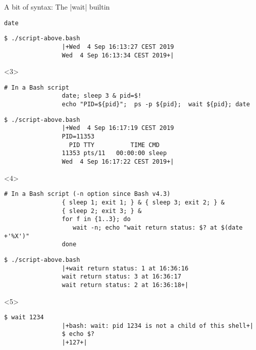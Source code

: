 \begin{frame}[fragile]{A bit of syntax: The \bash|wait| builtin}
\begin{overlayarea}{\textwidth}{0.7\textheight}
\begin{onlyenv}
\begin{lstlisting}[style=MyBash, numbers=none, aboveskip=3mm]
                date
            \end{lstlisting}
            \begin{lstlisting}[style=MyBash, numbers=none, aboveskip=1mm]
                $ ./script-above.bash
                |+Wed  4 Sep 16:13:27 CEST 2019
                Wed  4 Sep 16:13:34 CEST 2019+|
            \end{lstlisting}
        \end{onlyenv}
        \begin{onlyenv}<3>
            \begin{lstlisting}[style=MyBash, numbers=none, aboveskip=3mm]
                # In a Bash script
                date; sleep 3 & pid=$!
                echo "PID=${pid}";  ps -p ${pid};  wait ${pid}; date
            \end{lstlisting}
            \begin{lstlisting}[style=MyBash, numbers=none, aboveskip=1mm]
                $ ./script-above.bash
                |+Wed  4 Sep 16:17:19 CEST 2019
                PID=11353
                  PID TTY          TIME CMD
                11353 pts/11   00:00:00 sleep
                Wed  4 Sep 16:17:22 CEST 2019+|
            \end{lstlisting}
        \end{onlyenv}
        \begin{onlyenv}<4>
            \begin{lstlisting}[style=MyBash, numbers=none, aboveskip=3mm]
                # In a Bash script (-n option since Bash v4.3)
                { sleep 1; exit 1; } & { sleep 3; exit 2; } &
                { sleep 2; exit 3; } &
                for f in {1..3}; do
                   wait -n; echo "wait return status: $? at $(date +'%X')"
                done
            \end{lstlisting}
            \begin{lstlisting}[style=MyBash, numbers=none, aboveskip=1mm]
                $ ./script-above.bash
                |+wait return status: 1 at 16:36:16
                wait return status: 3 at 16:36:17
                wait return status: 2 at 16:36:18+|
            \end{lstlisting}
        \end{onlyenv}
        \begin{onlyenv}<5>
            \begin{lstlisting}[style=MyBash, numbers=none, aboveskip=3mm]
                $ wait 1234
                |+bash: wait: pid 1234 is not a child of this shell+|
                $ echo $?
                |+127+|
            \end{lstlisting}
        \end{onlyenv}
    \end{overlayarea}
\end{frame}
